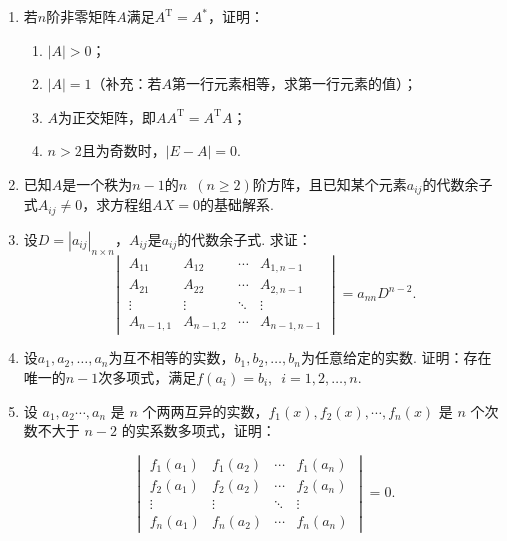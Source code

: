 \begin{enumerate}
    \item 若$n$阶非零矩阵$A$满足$A^\mathrm{T}=A^*$，证明：
          \begin{enumerate}
              \item $|A|>0$；

              \item $|A|=1$（补充：若$A$第一行元素相等，求第一行元素的值）；

              \item $A$为正交矩阵，即$AA^\mathrm{T}=A^\mathrm{T}A$；

              \item $n>2$且为奇数时，$|E-A|=0$.
          \end{enumerate}

    \item 已知$A$是一个秩为$n-1$的$n\enspace(n \geqslant 2)$阶方阵，且已知某个元素$a_{ij}$的代数余子式$A_{ij} \neq 0$，求方程组$AX=0$的基础解系.

    \item 设$D=|a_{ij}|_{n \times n}$，$A_{ij}$是$a_{ij}$的代数余子式. 求证：
          \[\begin{vmatrix}
                  A_{11}    & A_{12}    & \cdots & A_{1,n-1}   \\
                  A_{21}    & A_{22}    & \cdots & A_{2,n-1}   \\
                  \vdots    & \vdots    & \ddots & \vdots      \\
                  A_{n-1,1} & A_{n-1,2} & \cdots & A_{n-1,n-1}
              \end{vmatrix}=a_{nn}D^{n-2}.\]

    \item 设$a_1,a_2,\ldots,a_n$为互不相等的实数，$b_1,b_2,\ldots,b_n$为任意给定的实数. 证明：存在唯一的$n-1$次多项式，满足$f(a_i)=b_i,\enspace i=1,2,\ldots,n$.

    \item 设 $a_1,a_2\cdots,a_n$ 是 $n$ 个两两互异的实数，$f_1(x),f_2(x),\cdots,f_n(x)$ 是 $n$ 个次数不大于 $n-2$ 的实系数多项式，证明：

    \[\begin{vmatrix}
        f_1(a_1) & f_1(a_2) & \cdots & f_1(a_n) \\
        f_2(a_1) & f_2(a_2) & \cdots & f_2(a_n) \\
        \vdots   & \vdots   & \ddots & \vdots   \\
        f_n(a_1) & f_n(a_2) & \cdots & f_n(a_n)
    \end{vmatrix}=0.\]


\end{enumerate}
